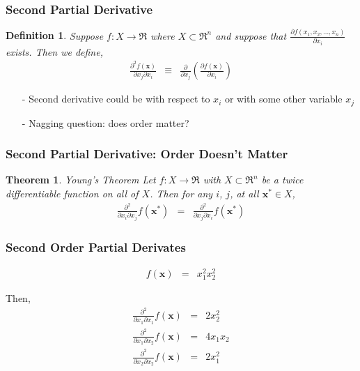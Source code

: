 \documentclass{beamer}
\newtheorem{thm}{Theorem}
\newtheorem{defn}{Definition}
\numberwithin{equation}{section}
\begin{document}
\begin{frame}
\frametitle{Second Partial Derivative}

\begin{defn}
Suppose $f:X \rightarrow \Re$ where $X \subset \Re^{n}$ and suppose that $\frac{\partial f(x_{1}, x_{2}, \hdots, x_{n})}{\partial x_{i} }$ exists.  Then we define, 
\begin{eqnarray}
\frac{ \partial^{2}  f(\boldsymbol{x}) }{\partial x_{j} \partial x_{i} } & \equiv & \frac{\partial}{\partial x_{j} } \left( \frac{\partial f(\boldsymbol{x})  }{\partial x_{i} }  \right) \nonumber 
\end{eqnarray}

\end{defn}

\begin{itemize}
\item[-] Second derivative could be with respect to $x_{i}$ or with some other variable $x_{j}$
\item[-] Nagging question: does order matter?
\end{itemize}


\end{frame}

\begin{frame}
\frametitle{Second Partial Derivative: Order Doesn't Matter} 

\begin{thm} 
\alert{Young's Theorem} Let $f: X \rightarrow \Re$ with $X \subset \Re^{n}$ be a twice differentiable function on all of $X$.  Then for any $i$, $j$, at all $\boldsymbol{x}^{*} \in X$, 
\begin{eqnarray}
\frac{\partial^{2} } {\partial x_{i} \partial x_{j} }f(\boldsymbol{x}^{*} ) & = &   \frac{\partial^{2} } {\partial x_{j} \partial x_{i} }f(\boldsymbol{x}^{*} ) \nonumber 
\end{eqnarray}

\end{thm}


\end{frame}

\begin{frame}
\frametitle{Second Order Partial Derivates} 

\begin{eqnarray}
f(\boldsymbol{x}) & = & x_{1}^2 x_{2}^2 \nonumber 
\end{eqnarray}

Then, 
\begin{eqnarray}
\frac{\partial^2}{\partial x_{1} \partial x_{1} } f(\boldsymbol{x}) & = & 2 x_{2}^{2} \nonumber \\
\frac{\partial^2}{\partial x_{1} \partial x_{2} } f(\boldsymbol{x}) & = & 4 x_{1} x_{2} \nonumber \\
\frac{\partial^2}{\partial x_{2} \partial x_{2} } f(\boldsymbol{x}) & = & 2 x_{1}^{2} \nonumber 
\end{eqnarray}


\end{frame}
\end{document}
